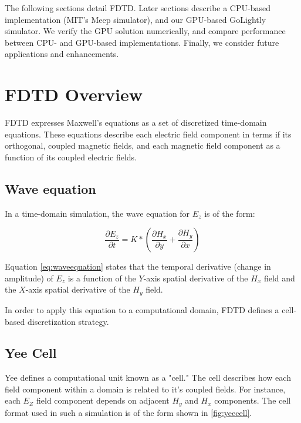 The following sections detail FDTD. Later sections describe a CPU-based implementation (MIT's  Meep simulator), and our GPU-based GoLightly simulator. We verify the GPU solution numerically, and compare performance between CPU- and GPU-based implementations. Finally, we consider future applications and enhancements. 


\section{FDTD Overview}

FDTD expresses Maxwell's equations as a set of discretized time-domain equations\cite{Yee}. These equations describe each electric field component in terms if its orthogonal, coupled magnetic fields, and each magnetic field component as a function of its coupled electric fields.


\subsection{Wave equation}

In a time-domain simulation, the wave equation for  $ E_z $ is of the form:

\begin{equation} \label{eq:waveequation} 
\frac{\partial E_z}{\partial t} = K * (\frac{\partial H_x}{\partial y} + \frac{\partial H_y}{\partial x})
\end{equation}

Equation \ref{eq:waveequation} states that the temporal derivative (change in amplitude) of $E_z$ is a function of the $Y$-axis spatial derivative of the $H_x$ field and the $X$-axis spatial derivative of the $H_y$ field.


In order to apply this equation to a computational domain, FDTD defines a cell-based discretization strategy.

\subsection{Yee Cell}

Yee \cite{Yee} defines a computational unit known as a "cell." The cell describes how each field component within a domain is related to it's coupled fields. For instance, each $E_Z$ field component depends on adjacent $H_y$ and $H_x$ components. The cell format used in such a simulation is of the form shown in \autoref{fig:yeecell}.

